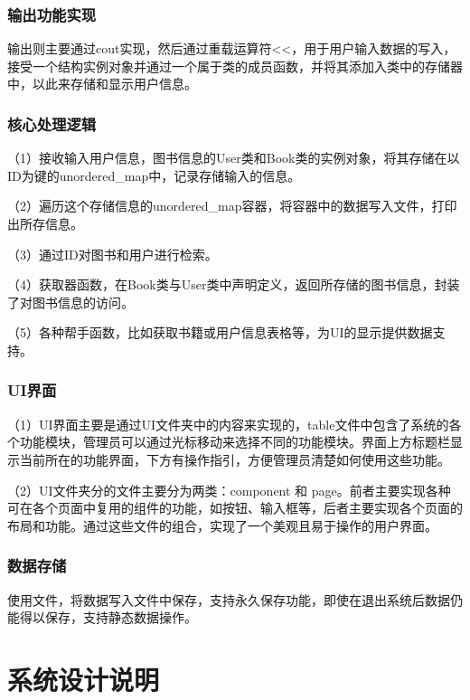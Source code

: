 \documentclass{article}
\begin{document}
\subsubsection{输出功能实现}
输出则主要通过cout实现，然后通过重载运算符\textless{}\textless{}，用于用户输入数据的写入，接受一个结构实例对象并通过一个属于类的成员函数，并将其添加入类中的存储器中，以此来存储和显示用户信息。\\
\subsubsection{核心处理逻辑}
（1）接收输入用户信息，图书信息的User类和Book类的实例对象，将其存储在以ID为键的unordered\_map中，记录存储输入的信息。

（2）遍历这个存储信息的unordered\_map容器，将容器中的数据写入文件，打印出所存信息。

（3）通过ID对图书和用户进行检索。

（4）获取器函数，在Book类与User类中声明定义，返回所存储的图书信息，封装了对图书信息的访问。

（5）各种帮手函数，比如获取书籍或用户信息表格等，为UI的显示提供数据支持。
\subsubsection{UI界面}

（1）UI界面主要是通过UI文件夹中的内容来实现的，table文件中包含了系统的各个功能模块，管理员可以通过光标移动来选择不同的功能模块。界面上方标题栏显示当前所在的功能界面，下方有操作指引，方便管理员清楚如何使用这些功能。

（2）UI文件夹分的文件主要分为两类：component 和 page。前者主要实现各种可在各个页面中复用的组件的功能，如按钮、输入框等，后者主要实现各个页面的布局和功能。通过这些文件的组合，实现了一个美观且易于操作的用户界面。
\subsubsection{数据存储}

使用文件，将数据写入文件中保存，支持永久保存功能，即使在退出系统后数据仍能得以保存，支持静态数据操作。\\
\section{系统设计说明}
\end{document}
